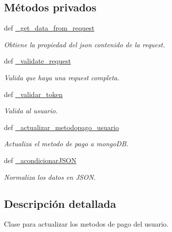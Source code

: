 \subsection*{Métodos privados}
\begin{DoxyCompactItemize}
\item 
def \hyperlink{classsrc_1_1resources_1_1modificar_metodo_pago_1_1_modificar_metodo_pago_a6f0373e55ec95ea65c242c0785a0586c}{\-\_\-get\-\_\-data\-\_\-from\-\_\-request}
\begin{DoxyCompactList}\small\item\em Obtiene la propiedad del json contenido de la request. \end{DoxyCompactList}\item 
def \hyperlink{classsrc_1_1resources_1_1modificar_metodo_pago_1_1_modificar_metodo_pago_adb1a37715e5a4bfa1dfc5f21e0e773d5}{\-\_\-validate\-\_\-request}
\begin{DoxyCompactList}\small\item\em Valida que haya una request completa. \end{DoxyCompactList}\item 
def \hyperlink{classsrc_1_1resources_1_1modificar_metodo_pago_1_1_modificar_metodo_pago_aca38355f5c041258af3f811d1d9471b0}{\-\_\-validar\-\_\-token}
\begin{DoxyCompactList}\small\item\em Valida al usuario. \end{DoxyCompactList}\item 
def \hyperlink{classsrc_1_1resources_1_1modificar_metodo_pago_1_1_modificar_metodo_pago_a044d91a7205bb28a175e320787ebb4ad}{\-\_\-actualizar\-\_\-metodopago\-\_\-usuario}
\begin{DoxyCompactList}\small\item\em Actualiza el metodo de pago a mongo\-D\-B. \end{DoxyCompactList}\item 
def \hyperlink{classsrc_1_1resources_1_1modificar_metodo_pago_1_1_modificar_metodo_pago_ad2e59b18c378548c9765c13c184acf26}{\-\_\-acondicionar\-J\-S\-O\-N}
\begin{DoxyCompactList}\small\item\em Normaliza los datos en J\-S\-O\-N. \end{DoxyCompactList}\end{DoxyCompactItemize}


\subsection{Descripción detallada}
Clase para actualizar los metodos de pago del usuario. 



